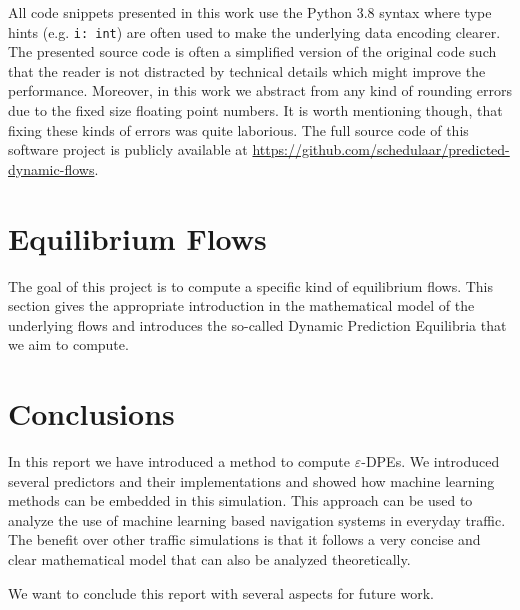 \documentclass[titlepage]{scrartcl}
\theoremstyle{definition}
\newcommand{\code}[1]{\texttt{#1}}
\begin{document}
    All code snippets presented in this work use the Python 3.8 syntax where type hints (e.g. \code{i: int}) are often used to make the underlying data encoding clearer.
    The presented source code is often a simplified version of the original code such that the reader is not distracted by technical details which might improve the performance.
    Moreover, in this work we abstract from any kind of rounding errors due to the fixed size floating point numbers.
    It is worth mentioning though, that fixing these kinds of errors was quite laborious. 
    The full source code of this software project is publicly available at \url{https://github.com/schedulaar/predicted-dynamic-flows}.

    \clearpage
    

    \clearpage
    \section{Equilibrium Flows}\label{sec:equilibrium-flows}

    The goal of this project is to compute a specific kind of equilibrium flows.
    This section gives the appropriate introduction in the mathematical model of the underlying flows and introduces the so-called Dynamic Prediction Equilibria that we aim to compute.
    
    
    

    \clearpage
    
    
    \clearpage
    

    \clearpage
    \section{Conclusions}

    In this report we have introduced a method to compute $\varepsilon$-DPEs.
    We introduced several predictors and their implementations and showed how machine learning methods can be embedded in this simulation.
    This approach can be used to analyze the use of machine learning based navigation systems in everyday traffic.
    The benefit over other traffic simulations is that it follows a very concise and clear mathematical model that can also be analyzed theoretically.

    We want to conclude this report with several aspects for future work.
\end{document}
